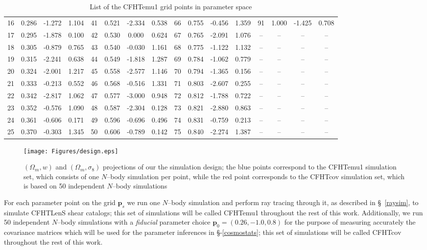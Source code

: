 \documentclass[reprint,aps,prd,superscriptaddress,showkeys,showpacs]{revtex4-1}
\begin{document}
\begin{table*}
\begin{tabular}{c|ccc||c|ccc||c|ccc||c|ccc}
16 & 0.286 & -1.272 & 1.104 & 41 & 0.521 & -2.334 & 0.538 & 66 & 0.755 & -0.456 & 1.359 & 91 & 1.000 & -1.425 & 0.708 \\
17 & 0.295 & -1.878 & 0.100 & 42 & 0.530 & 0.000 & 0.624 & 67 & 0.765 & -2.091 & 1.076 & -- & -- & -- & -- \\
18 & 0.305 & -0.879 & 0.765 & 43 & 0.540 & -0.030 & 1.161 & 68 & 0.775 & -1.122 & 1.132 & -- & -- & -- & -- \\
19 & 0.315 & -2.241 & 0.638 & 44 & 0.549 & -1.818 & 1.287 & 69 & 0.784 & -1.062 & 0.779 & -- & -- & -- & -- \\
20 & 0.324 & -2.001 & 1.217 & 45 & 0.558 & -2.577 & 1.146 & 70 & 0.794 & -1.365 & 0.156 & -- & -- & -- & -- \\
21 & 0.333 & -0.213 & 0.552 & 46 & 0.568 & -0.516 & 1.331 & 71 & 0.803 & -2.607 & 0.255 & -- & -- & -- & -- \\
22 & 0.342 & -2.817 & 1.062 & 47 & 0.577 & -3.000 & 0.948 & 72 & 0.812 & -1.788 & 0.722 & -- & -- & -- & -- \\
23 & 0.352 & -0.576 & 1.090 & 48 & 0.587 & -2.304 & 0.128 & 73 & 0.821 & -2.880 & 0.863 & -- & -- & -- & -- \\
24 & 0.361 & -0.606 & 0.171 & 49 & 0.596 & -0.696 & 0.496 & 74 & 0.831 & -0.759 & 0.213 & -- & -- & -- & -- \\
25 & 0.370 & -0.303 & 1.345 & 50 & 0.606 & -0.789 & 0.142 & 75 & 0.840 & -2.274 & 1.387 & -- & -- & -- & -- \\
\end{tabular}
\caption{List of the CFHTemu1 grid points in parameter space}
\label{designtable}
\end{table*}
%
\begin{figure*}
\begin{center}
\texttt{[image: Figures/design.eps]}
\caption{$(\Omega_m,w)$ and $(\Omega_m,\sigma_8)$ projections of our the simulation design; the blue points correspond to the CFHTemu1 simulation set, which consists of one $N$--body simulation per point, while the red point corresponds to the CFHTcov simulation set, which is based on 50 independent $N$--body simulations}
\label{designfig}
\end{center}
\end{figure*}
%
For each parameter point on the grid $\mathbf{p}_s$ we run one $N$--body simulation and perform ray tracing through it, as described in \S~\ref{raysim}, to simulate CFHTLenS shear catalogs; this set of simulations will be called CFHTemu1 throughout the rest of this work. Additionally, we run 50 independent $N$--body simulations with a \textit{fiducial} parameter choice $\mathbf{p}_0=(0.26,-1.0,0.8)$ for the purpose of measuring accurately the covariance matrices which will be used for the parameter inferences in \S-\ref{cosmostats}; this set of simulations will be called CFHTcov throughout the rest of this work.    
\end{document}
